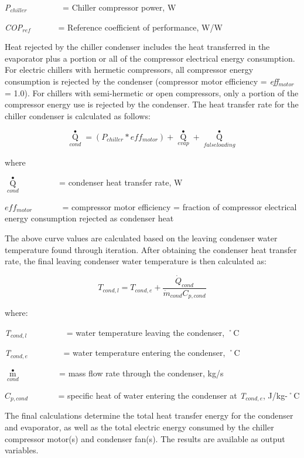 \emph{P\(_{chiller}\)}~~~~~~~~ = Chiller compressor power, W

\emph{COP\(_{ref}\)}~~~~~~ = Reference coefficient of performance, W/W

Heat rejected by the chiller condenser includes the heat transferred in the evaporator plus a portion or all of the compressor electrical energy consumption. For electric chillers with hermetic compressors, all compressor energy consumption is rejected by the condenser (compressor motor efficiency = \emph{eff\(_{motor}\)} = 1.0). For chillers with semi-hermetic or open compressors, only a portion of the compressor energy use is rejected by the condenser. The heat transfer rate for the chiller condenser is calculated as follows:

\begin{equation}
{\mathop Q\limits^ \bullet_{cond}} = \left( {{P_{chiller}} * ef{f_{motor}}} \right) + {\mathop Q\limits^ \bullet_{evap}} + {\mathop Q\limits^ \bullet_{falseloading}}
\end{equation}

where

\({\mathop Q\limits^ \bullet_{cond}}\) ~~~~~~~~ = condenser heat transfer rate, W

\(ef{f_{motor}}\) ~~~~~~ = compressor motor efficiency = fraction of compressor electrical energy consumption rejected as condenser heat

The above curve values are calculated based on the leaving condenser water temperature found through iteration. After obtaining the condenser heat transfer rate, the final leaving condenser water temperature is then calculated as:

\begin{equation}
  T_{cond,l} = T_{cond,e} + \frac{\dot{Q}_{cond}}{\dot{m}_{cond} C_{p,cond}}
\end{equation}

where:

\emph{T\(_{cond,l}\)}~~~~~~~~~ = water temperature leaving the condenser, ˚C

\emph{T\(_{cond,e}\)}~~~~~~~~ = water temperature entering the condenser, ˚C

\({\mathop m\limits^ \bullet_{cond}}\) ~~~~~~~~ = mass flow rate through the condenser, kg/s

\({C_{p,cond}}\) ~~~~~~ = specific heat of water entering the condenser at \emph{T\(_{cond,e}\)}, J/kg-˚C

The final calculations determine the total heat transfer energy for the condenser and evaporator, as well as the total electric energy consumed by the chiller compressor motor(s) and condenser fan(s). The results are available as output variables.

